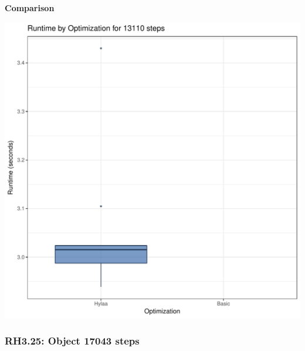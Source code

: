 \documentclass{article}\usepackage[]{graphicx}\usepackage[]{color}
\makeatletter
\def\maxwidth{ %
  \ifdim\Gin@nat@width>\linewidth
    \linewidth
  \else
    \Gin@nat@width
  \fi
}
\newenvironment{knitrout}{}{} %
\makeatother
\begin{document}
 \textbf{Comparison}
  
\begin{knitrout}
\color{fgcolor}
\includegraphics[width=\maxwidth]{figure/RH3_steps13110-1} 

\end{knitrout}


\subsubsection{RH3.25: Object 17043 steps}
\end{document}
